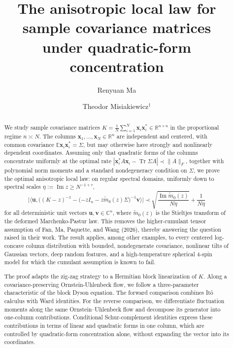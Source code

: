\documentclass[11pt,reqno]{amsart}
\title[Anisotropic local law under quadratic-form concentration]{The anisotropic local law for sample covariance matrices\\
under quadratic-form concentration}
\author[Ma]{Renyuan Ma}
\author[Misiakiewicz]{Theodor Misiakiewicz$^{\dagger}$}
\date{}
\def\R{\mathbb{R}}
\def\u{\mathbf{u}}
\def\bv{\mathbf{v}}
\def\x{\mathbf{x}}
\def\C{\mathbb{C}}
\def\E{\mathbb{E}}
\def\Im{\operatorname{Im}}
\def\Tr{\operatorname{Tr}}
\def\<{\langle} %
\def\>{\rangle}
\theoremstyle{definition}
\numberwithin{equation}{section}
\numberwithin{figure}{section}
\begin{document}
\begin{abstract}
           We study sample covariance matrices $K = \frac{1}{N} \sum_{i=1}^N \x_i \x_i^* \in \R^{n \times n}$ in the proportional regime $n \asymp N$. The columns $\x_1, \ldots, \x_N \in \R^n$ are independent and centered, with common covariance $\E \x_i \x_i^* = \Sigma$, but may otherwise have strongly and nonlinearly dependent coordinates. Assuming only that quadratic forms of the columns concentrate uniformly at the optimal rate $| \x_i^* A \x_i - \Tr \Sigma A | \prec \| A \|_F$, together with polynomial norm moments and a standard nondegeneracy condition on $\Sigma$, we prove the optimal anisotropic local law: on regular spectral domains, uniformly down to spectral scales $\eta:= \Im z \geq N^{-1 + \tau}$,
    \[
    \big| \< \u , \big( (K-z)^{-1} - (-zI_n-z\widetilde m_0(z)\Sigma \big)^{-1} \bv \> \big| \prec \sqrt{\frac{\Im \widetilde m_0 (z)}{N\eta}} + \frac{1}{N\eta}
    \] 
    for all deterministic unit vectors $\u,\bv \in \C^n$, where $\widetilde m_0(z)$ is the Stieltjes transform of the deformed Marchenko-Pastur law. This removes the higher-cumulant tensor assumption of Fan, Ma, Paquette, and Wang (2026), thereby answering the question raised in their work. The result applies, among other examples, to every centered log-concave column distribution with bounded, nondegenerate covariance, nonlinear tilts of Gaussian vectors, deep random features, and a high-temperature spherical 4-spin model for which the cumulant assumption is known to fail.

        The proof adapts the zig-zag strategy to a Hermitian block linearization of $K$. Along a covariance-preserving Ornstein-Uhlenbeck flow, we follow a three-parameter characteristic of the block Dyson equation. The forward comparison combines It\^o calculus with Ward identities. For the reverse comparison, we differentiate fluctuation moments along the same Ornstein–Uhlenbeck flow and decompose its generator into one-column contributions. Conditional Schur-complement identities express these contributions in terms of linear and quadratic forms in one column, which are controlled by quadratic-form concentration alone, without expanding the vector into its coordinates. 

\end{abstract}
\end{document}
